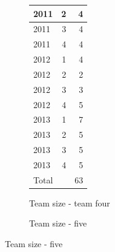 \documentclass[UKenglish]{ifimaster}  %
\begin{document}
\begin{figure}
\begin{subfigure}[b]{0.2\textwidth}
{\begin{tabular}{ | l | r | r | }
	2011 & 2 & 4 \\ \hline
	2011 & 3 & 4 \\ \hline
	2011 & 4 & 4 \\ \hline
	2012 & 1 & 4 \\ \hline
	2012 & 2 & 2 \\ \hline
	2012 & 3 & 3 \\ \hline
	2012 & 4 & 5 \\ \hline
	2013 & 1 & 7 \\ \hline
	2013 & 2 & 5 \\ \hline
	2013 & 3 & 5 \\ \hline
	2013 & 4 & 5 \\ \hline
	Total & &63  \\ \hline
\end{tabular}
}
\caption{Team size - team four}
 \label{Team:4}
\end{subfigure}
\begin{subfigure}[b]{0.1\textwidth}
\center
\caption{Team size - five}
 \label{Team:5}
\end{subfigure}


\end{figure}
\end{document}
